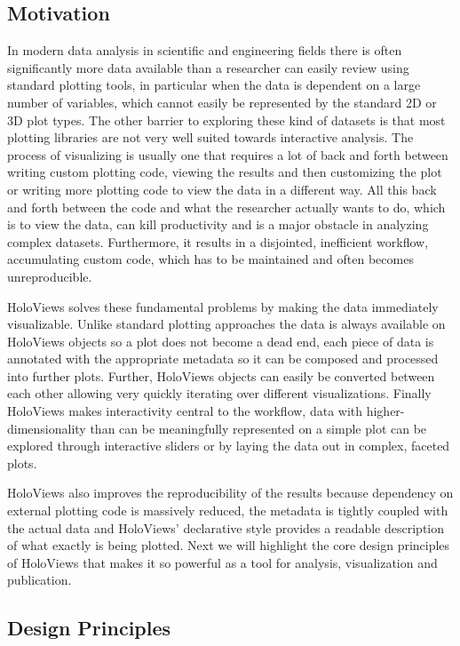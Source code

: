 \subsection{Motivation}

In modern data analysis in scientific and engineering fields there is
often significantly more data available than a researcher can easily
review using standard plotting tools, in particular when the data is
dependent on a large number of variables, which cannot easily be
represented by the standard 2D or 3D plot types. The other barrier to
exploring these kind of datasets is that most plotting libraries are
not very well suited towards interactive analysis. The process of
visualizing is usually one that requires a lot of back and forth
between writing custom plotting code, viewing the results and then
customizing the plot or writing more plotting code to view the data in
a different way. All this back and forth between the code and what the
researcher actually wants to do, which is to view the data, can kill
productivity and is a major obstacle in analyzing complex
datasets. Furthermore, it results in a disjointed, inefficient
workflow, accumulating custom code, which has to be maintained and
often becomes unreproducible.

HoloViews solves these fundamental problems by making the data
immediately visualizable. Unlike standard plotting approaches the data
is always available on HoloViews objects so a plot does not become a
dead end, each piece of data is annotated with the appropriate
metadata so it can be composed and processed into further
plots. Further, HoloViews objects can easily be converted between each
other allowing very quickly iterating over different
visualizations. Finally HoloViews makes interactivity central to the
workflow, data with higher-dimensionality than can be meaningfully
represented on a simple plot can be explored through interactive
sliders or by laying the data out in complex, faceted plots.

HoloViews also improves the reproducibility of the results because
dependency on external plotting code is massively reduced, the
metadata is tightly coupled with the actual data and HoloViews'
declarative style provides a readable description of what exactly is
being plotted. Next we will highlight the core design principles of
HoloViews that makes it so powerful as a tool for analysis,
visualization and publication.

\subsection{Design Principles}

